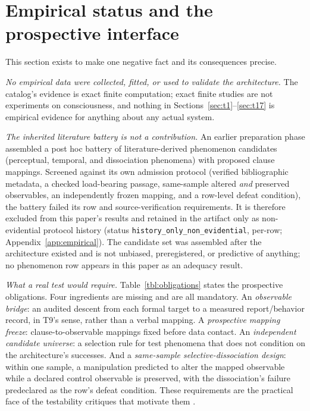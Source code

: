 \section{Empirical status and the prospective interface}
\label{sec:empirical}

This section exists to make one negative fact and its consequences precise.

\emph{No empirical data were collected, fitted, or used to validate the
architecture.} The catalog's evidence is exact finite computation; exact
finite studies are not experiments on consciousness, and nothing in
Sections~\ref{sec:t1}--\ref{sec:t17} is empirical evidence for anything about
any actual system.

\emph{The inherited literature battery is not a contribution.} An earlier
preparation phase assembled a post hoc battery of literature-derived
phenomenon candidates (perceptual, temporal, and dissociation phenomena) with
proposed clause mappings. Screened against its own admission protocol
(verified bibliographic metadata, a checked load-bearing passage, same-sample
altered \emph{and} preserved observables, an independently frozen mapping,
and a row-level defeat condition), the battery failed its row and
source-verification requirements. It is therefore excluded from this paper's
results and retained in the artifact only as non-evidential protocol history
(status \texttt{history\_only\_non\_evidential}, per-row;
Appendix~\ref{app:empirical}). The candidate set was assembled after the
architecture existed and is not unbiased, preregistered, or predictive of
anything; no phenomenon row appears in this paper as an adequacy result.

\emph{What a real test would require.} Table~\ref{tbl:obligations} states the
prospective obligations. Four ingredients are missing and are all mandatory.
An \emph{observable bridge}: an audited descent from each formal target to
a measured report/behavior record, in T9's sense, rather than a verbal
mapping. A \emph{prospective mapping freeze}: clause-to-observable mappings
fixed before data contact. An \emph{independent candidate universe}: a
selection rule for test phenomena that does not condition on the
architecture's successes. And a \emph{same-sample selective-dissociation
design}: within one sample, a manipulation predicted to alter the mapped
observable while a declared control observable is preserved, with the
dissociation's failure predeclared as the row's defeat condition. These
requirements are the practical face of the testability critiques that
motivate them \citep{KleinerHoel2021, DoerigEtAl2020HardCriteria}.

